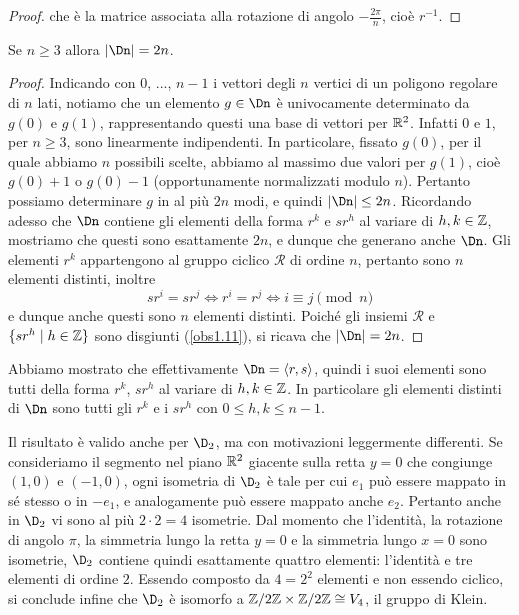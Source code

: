 \documentclass[11pt]{scrartcl}
\begin{document}
\begin{proof}
		che è la matrice associata alla rotazione di angolo $-
		\frac{2\pi}{n}$, cioè $r^{-1}$.
	\end{proof}
	
	\begin{proposition}
		Se $n \geq 3$ allora $\lvert \Dn \rvert = 2n$.
	\end{proposition}
	
	\begin{proof}
		Indicando con $0$, ..., $n-1$ i vettori degli $n$ vertici di un poligono regolare di $n$ lati, notiamo
		che un elemento $g \in \Dn$ è univocamente determinato da $g(0)$ e $g(1)$, rappresentando
		questi una base di vettori per $\mathbb R^2$. Infatti $0$ e $1$, per $n \geq 3$, sono
		linearmente indipendenti.
		In particolare, fissato $g(0)$, per il quale abbiamo $n$ possibili scelte,
		abbiamo al massimo due valori per $g(1)$, cioè $g(0) + 1$ o $g(0) - 1$ (opportunamente
		normalizzati modulo $n$). Pertanto possiamo determinare $g$ in al più $2n$ modi, e quindi 
		$\lvert \Dn \rvert \leq 2n$. Ricordando adesso che $\Dn$ contiene gli elementi
		della forma $r^k$ e $sr^h$ al variare di $h, k \in \mathbb Z$, mostriamo che questi sono 
		esattamente $2n$, e dunque che generano anche $\Dn$. Gli elementi $r^k$ appartengono al gruppo ciclico $\mathcal{R}$
		di ordine $n$, pertanto sono $n$ elementi distinti, inoltre 
		\[
		sr^i = sr^j \iff r^i = r^j\iff i \equiv j \pmod n
		\] e dunque anche questi sono $n$
		elementi distinti. Poiché gli insiemi $\mathcal{R}$ e 
		$\{sr^h\mid h \in \mathbb Z\}$ sono disgiunti (\autoref{obs1.11}), 
		si ricava che $\lvert \Dn \rvert = 2n$.
	\end{proof}
	
	\begin{remark}
		Abbiamo mostrato che effettivamente $\Dn = \langle r, s\rangle$, quindi i
		suoi elementi sono tutti della forma $r^k$, $sr^h$ al variare di $h, k \in \mathbb Z$. In
		particolare gli elementi distinti di $\Dn$ sono tutti gli $r^k$ e i $sr^h$ con
		$0 \leq h, k \leq n-1$.
	\end{remark}
	
	\begin{remark}
		Il risultato è valido anche per $\D_2$, ma con motivazioni leggermente differenti. 
		Se consideriamo il segmento nel piano $\mathbb R^2$ giacente sulla retta $y = 0$ che
		congiunge $(1, 0)$ e $(-1, 0)$, ogni isometria di $\D_2$ è tale per cui
		$e_1$ può essere mappato in sé stesso o in $-e_1$, e analogamente può essere
		mappato anche $e_2$. Pertanto anche in $\D_2$ vi sono al più $2 \cdot 2 = 4$
		isometrie. Dal momento che l'identità, la rotazione di 
		angolo $\pi$, la simmetria lungo la retta $y = 0$ e la simmetria lungo $x=0$ sono
		isometrie,
		$\D_2$ contiene quindi esattamente quattro elementi:
		l'identità e tre elementi di ordine $2$. Essendo composto da $4 = 2^2$ elementi
		e non essendo ciclico, si conclude infine che
		$\D_2$ è isomorfo a $\mathbb{Z}/{2}\mathbb{Z}\times\mathbb{Z}/{2}\mathbb{Z} \cong V_4$,
		il gruppo di Klein.
	\end{remark}
	
\end{document}
